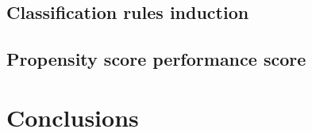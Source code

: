\documentclass[conference]{IEEEtran}
\begin{document}
\subsection{Classification rules induction}
\subsection{Propensity score performance score}


\section{Conclusions}






\end{document}
